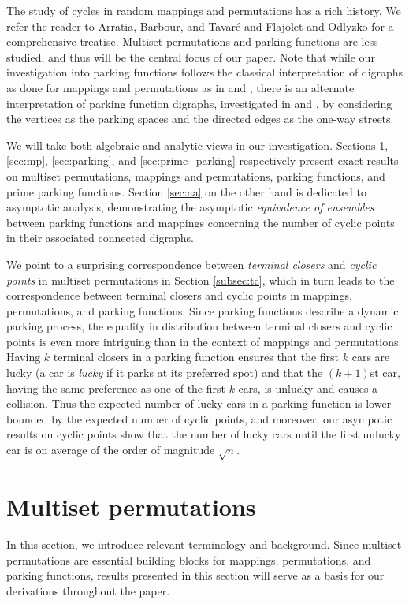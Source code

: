 \documentclass[letterpaper]{amsart}
\theoremstyle{plain}
\theoremstyle{definition}
\theoremstyle{remark}
\begin{document}
The study of cycles in random mappings and permutations has a rich history. We refer the reader to Arratia, Barbour, and Tavar\'{e} \cite{Arratia2003} and Flajolet and Odlyzko \cite{Flajolet1990} for a comprehensive treatise. Multiset permutations and parking functions are less studied, and thus will be the central focus of our paper. Note that while our investigation into parking functions follows the classical interpretation of digraphs as done for mappings and permutations as in \cite{Paguyo2025} and \cite{Rubey2025}, there is an alternate interpretation of parking function digraphs, investigated in \cite{King2019} and \cite{Lackner2016}, by considering the vertices as the parking spaces and the directed edges as the one-way streets.

We will take both algebraic and analytic views in our investigation. Sections \ref{sec:multi}, \ref{sec:mp}, \ref{sec:parking}, and \ref{sec:prime_parking} respectively present exact results on multiset permutations, mappings and permutations, parking functions, and prime parking functions. Section \ref{sec:aa} on the other hand is dedicated to asymptotic analysis, demonstrating the asymptotic \emph{equivalence of ensembles} between parking functions and mappings concerning the number of cyclic points in their associated connected digraphs.

We point to a surprising correspondence between \emph{terminal closers} and \emph{cyclic points} in multiset permutations in Section \ref{subsec:tc}, which in turn leads to the correspondence between terminal closers and cyclic points in mappings, permutations, and parking functions. Since parking functions describe a dynamic parking process, the equality in distribution between terminal closers and cyclic points is even more intriguing than in the context of mappings and permutations. Having $k$ terminal closers in a parking function ensures that the first $k$ cars are lucky (a car is {\em lucky} if it parks at its preferred spot) and that the $(k+1)$st car, having the same preference as one of the first $k$ cars, is unlucky and causes a collision. Thus the expected number of lucky cars in a parking function is lower bounded by the expected number of cyclic points, and moreover, our asympotic results on cyclic points show that the number of lucky cars until the first unlucky car is on average of the order of magnitude $\sqrt{n}$.


\section{Multiset permutations}
\label{sec:multi}
In this section, we introduce relevant terminology and background. Since multiset permutations are essential building blocks for mappings, permutations, and parking functions, results presented in this section will serve as a basis for our derivations throughout the paper.
\end{document}
